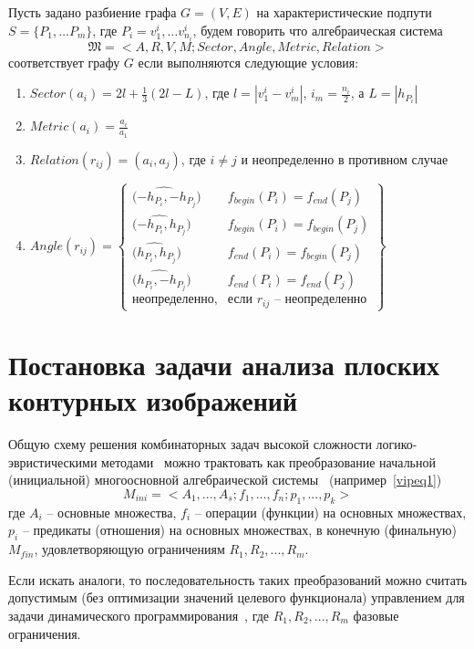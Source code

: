 \begin{definition}
Пусть задано разбиение графа $G=(V,E)$ на характеристические подпути $S=\{P_1, \dots P_m\}$, где $P_i=v^i_1, \dots v^i_{n_i}$, будем говорить что алгебраическая система
$$\mathfrak{M} = < A, R, V, M; Sector, Angle, Metric, Relation >$$
соответствует графу $G$ если выполняются следующие условия:
\begin{enumerate}
\item $Sector(a_i) = 2l + \frac{1}{3}(2l - L)$, где $l=|v^i_1-v^i_m|$, $i_m = \frac{n_i}{2}$,  а $L=|h_{P_i}|$
\item $Metric(a_i) = \frac{a_i}{a_1}$
\item $Relation(r_{ij}) = (a_i, a_j)$, где $i\neq j$ и неопределенно в противном случае
\item $Angle(r_{ij})=
	\left\{		
	\begin{array}{ll}
	\hat{(-h_{P_i}, -h_{P_j}}) & f_{begin}(P_i) = f_{end}(P_j) \\
	\hat{(-h_{P_i}, h_{P_j}}) & f_{begin}(P_i) = f_{begin}(P_j) \\
	\hat{(h_{P_i}, h_{P_j}}) & f_{end}(P_i) = f_{begin}(P_j) \\
	\hat{(h_{P_i}, -h_{P_j}}) & f_{end}(P_i) = f_{end}(P_j) \\	
	\text{неопределенно}, & \text{если } r_{ij} \text{ -- неопределенно}
	\end{array}
	\right\}	$	
\end{enumerate}
\end{definition}

\section{Постановка задачи анализа плоских контурных изображений }
Общую схему решения комбинаторных задач высокой сложности логико-эвристическими методами~\cite{4} можно трактовать как преобразование начальной (инициальной) многоосновной алгебраической системы~\cite{6,7} (например~\ref{vipeq1})
\begin{equation}
M_{ini} = <A_1,...,A_s;f_1,...,f_n;p_1,...,p_k>
\label{vipeq2}
\end{equation}
где $A_i$ -- основные множества, $f_i$ -- операции (функции) на основных множествах, $p_i$ -- предикаты (отношения) на основных множествах, в конечную (финальную) $M_{fin}$, удовлетворяющую ограничениям $R_1,R_2,...,R_m$.

Если искать аналоги, то последовательность таких преобразований можно считать допустимым (без оптимизации значений целевого функционала) управлением для задачи динамического программирования~\cite{9}, где $R_1,R_2,...,R_m$ фазовые ограничения.

